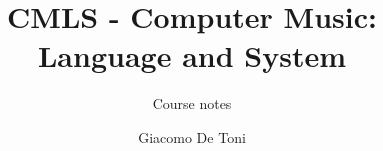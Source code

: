 \documentclass{GDTReportClass}
\title{CMLS - Computer Music: Language and System}  %
\subtitle{Course notes}  %
\author{Giacomo De Toni}  %
\begin{document}
    \settingfrontmatter  %

    \settingmaincontent  

    
\end{document}

